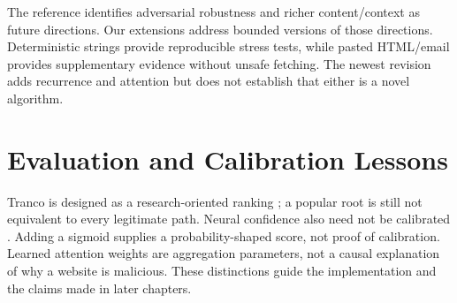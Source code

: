 The reference identifies adversarial robustness and richer content/context as future directions. Our extensions address bounded versions of those directions. Deterministic strings provide reproducible stress tests, while pasted HTML/email provides supplementary evidence without unsafe fetching. The newest revision adds recurrence and attention but does not establish that either is a novel algorithm.

\section{Evaluation and Calibration Lessons}
Tranco is designed as a research-oriented ranking \cite{lepochat2019tranco}; a popular root is still not equivalent to every legitimate path. Neural confidence also need not be calibrated \cite{guo2017calibration}. Adding a sigmoid supplies a probability-shaped score, not proof of calibration. Learned attention weights \cite{attention} are aggregation parameters, not a causal explanation of why a website is malicious. These distinctions guide the implementation and the claims made in later chapters.